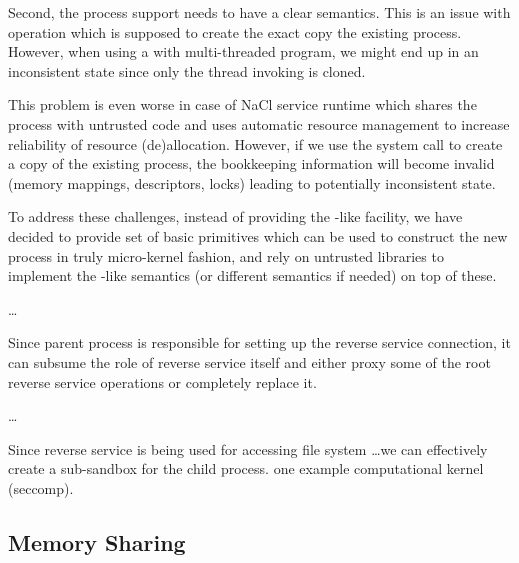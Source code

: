 Second, the process support needs to have a clear semantics. This is an
issue with  operation which is supposed to create the
exact copy the existing process. However, when using a 
with multi-threaded program, we might end up in an inconsistent state
since only the thread invoking  is cloned.

This problem is even worse in case of NaCl service runtime which shares
the process with untrusted code and uses automatic resource management
to increase reliability of resource (de)allocation. However, if we use
the  system call to create a copy of the existing process,
the bookkeeping information will become invalid (\eg memory mappings,
descriptors, locks) leading to potentially inconsistent state.

To address these challenges, instead of providing the
-like facility, we have decided to provide set of basic
primitives which can be used to construct the new process in truly
micro-kernel fashion, and rely on untrusted libraries to implement the
-like semantics (\eg or different semantics if needed) on
top of these.

\ldots

Since parent process is responsible for setting up the reverse service
connection, it can subsume the role of reverse service itself and either
proxy some of the root reverse service operations or completely replace
it.

\ldots

Since reverse service is being used for accessing file system \ldots we
can effectively create a sub-sandbox for the child process. one example
computational kernel (seccomp).

\subsection{Memory Sharing}
\label{sub:memory_sharing}

